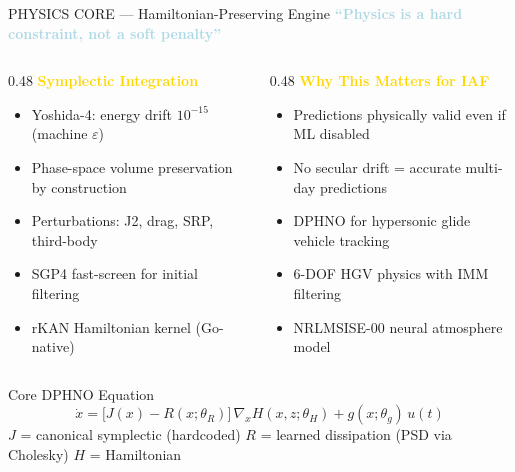 \documentclass[aspectratio=169,11pt]{beamer}
\begin{document}
\begin{frame}{PHYSICS CORE — Hamiltonian-Preserving Engine}
\textcolor{lightblue}{\textbf{``Physics is a hard constraint, not a soft penalty''}}

\vspace{0.2cm}
\begin{columns}[T]
  \begin{column}{0.48\textwidth}
    \textcolor{gold}{\textbf{Symplectic Integration}}
    \begin{itemize}\small
      \item Yoshida-4: energy drift $10^{-15}$ (machine $\varepsilon$)
      \item Phase-space volume preservation by construction
      \item Perturbations: J2, drag, SRP, third-body
      \item SGP4 fast-screen for initial filtering
      \item rKAN Hamiltonian kernel (Go-native)
    \end{itemize}
  \end{column}
  \begin{column}{0.48\textwidth}
    \textcolor{gold}{\textbf{Why This Matters for IAF}}
    \begin{itemize}\small
      \item Predictions physically valid even if ML disabled
      \item No secular drift = accurate multi-day predictions
      \item DPHNO for hypersonic glide vehicle tracking
      \item 6-DOF HGV physics with IMM filtering
      \item NRLMSISE-00 neural atmosphere model
    \end{itemize}
  \end{column}
\end{columns}

\vspace{0.4cm}
\begin{block}{Core DPHNO Equation}
\[
\dot{x} = \bigl[J(x) - R(x;\theta_R)\bigr]\,\nabla_x H(x,z;\theta_H) + g(x;\theta_g)\,u(t)
\]
\small $J$ = canonical symplectic (hardcoded) \quad $R$ = learned dissipation (PSD via Cholesky) \quad $H$ = Hamiltonian
\end{block}
\end{frame}
\end{document}
